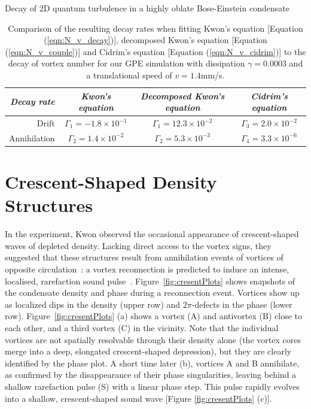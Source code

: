 \begin{chapter}{\label{cha:shin}Decay of 2D quantum turbulence in a highly oblate Bose-Einstein condensate}
\begin{table}
\centering
\begin{tabular}{r|ccc}
{\it Decay rate} & {\it Kwon's equation} & {\it Decomposed Kwon's equation} & {\it Cidrim's equation} \\
\hline 
\rule{0pt}{3ex} Drift        & $\Gamma_1 = -1.8\times 10^{-1}$ & $\Gamma_1 = 12.3 \times 10^{-2}$ & $\Gamma_3 = 2.0 \times 10^{-2}$ \\
\rule{0pt}{3ex} Annihilation & $\Gamma_2 = 1.4\times 10^{-2}$ &  $\Gamma_2 = 5.3 \times 10^{-3}$  & $\Gamma_4 = 3.3 \times 10^{-6}$ \\
\end{tabular}
\caption{\label{tbl:fitting_comp} Comparison of the resulting decay rates when fitting Kwon's equation [Equation (\ref{eqn:N_v_decay})], decomposed Kwon's equation [Equation (\ref{eqn:N_v_couple})] and Cidrim's equation [Equation (\ref{eqn:N_v_cidrim})] to the decay of vortex number for our GPE simulation with dissipation $\gamma=0.0003$ and a translational speed of $v=1.4$mm/s.}
\end{table}

\section{Crescent-Shaped Density Structures}
In the experiment, Kwon \etal observed the occasional appearance of crescent-shaped waves of 
depleted density.  Lacking direct access to the vortex signs,
they suggested that these structures result from
annihilation events of vortices of opposite 
circulation~\citep{nazarenko_onorato_07,rorai_skreenivasan_12,prabhakar_singh_13}: a vortex reconnection is predicted to 
induce an intense, localised, rarefaction 
sound pulse~\cite{leadbeater,zuccher}.  
Figure~\ref{fig:cresentPlots} shows snapshots of the condensate density 
and phase during a reconnection event. Vortices show up as localized dips 
in the density (upper row) and $2 \pi$-defects in the phase (lower row). 
Figure~\ref{fig:cresentPlots} (a) shows a vortex (A) and antivortex (B) 
close to each other, and a third vortex (C) in the vicinity.
Note that the individual vortices are not spatially resolvable 
through their density alone (the vortex cores merge into a deep, elongated 
crescent-shaped depression), but they are clearly identified by the 
phase plot.  A short time later (b), vortices A and B annihilate, 
as confirmed by the disappearance of their phase singularities, 
leaving behind a shallow rarefaction pulse (S) with a linear phase step.  
This pulse rapidly evolves into a shallow, 
crescent-shaped sound wave [Figure \ref{fig:cresentPlots} (c)].  


\end{chapter}
